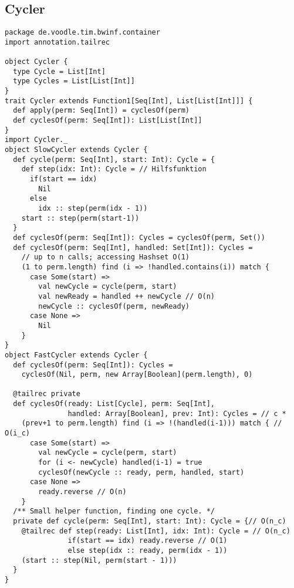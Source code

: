 \subsection{Cycler}
\lstset{basicstyle=\ttfamily\small}
\begin{lstlisting}
package de.voodle.tim.bwinf.container
import annotation.tailrec

object Cycler {
  type Cycle = List[Int]
  type Cycles = List[List[Int]]
}
trait Cycler extends Function1[Seq[Int], List[List[Int]]] {
  def apply(perm: Seq[Int]) = cyclesOf(perm)
  def cyclesOf(perm: Seq[Int]): List[List[Int]]
}
import Cycler._
object SlowCycler extends Cycler {
  def cycle(perm: Seq[Int], start: Int): Cycle = {
    def step(idx: Int): Cycle = // Hilfsfunktion
      if(start == idx)
        Nil
      else
        idx :: step(perm(idx - 1))
    start :: step(perm(start-1))
  }
  def cyclesOf(perm: Seq[Int]): Cycles = cyclesOf(perm, Set())
  def cyclesOf(perm: Seq[Int], handled: Set[Int]): Cycles =
    // up to n calls; accessing Hashset O(1)
    (1 to perm.length) find (i => !handled.contains(i)) match {
      case Some(start) =>
        val newCycle = cycle(perm, start)
        val newReady = handled ++ newCycle // O(n)
        newCycle :: cyclesOf(perm, newReady)
      case None =>
        Nil
    }
}
object FastCycler extends Cycler {
  def cyclesOf(perm: Seq[Int]): Cycles =
    cyclesOf(Nil, perm, new Array[Boolean](perm.length), 0)

  @tailrec private
  def cyclesOf(ready: List[Cycle], perm: Seq[Int],
               handled: Array[Boolean], prev: Int): Cycles = // c *
    (prev+1 to perm.length) find (i => !(handled(i-1))) match { // O(i_c)
      case Some(start) =>
        val newCycle = cycle(perm, start)
        for (i <- newCycle) handled(i-1) = true
        cyclesOf(newCycle :: ready, perm, handled, start)
      case None =>
        ready.reverse // O(n)
    }
  /** Small helper function, finding one cycle. */
  private def cycle(perm: Seq[Int], start: Int): Cycle = {// O(n_c)
    @tailrec def step(ready: List[Int], idx: Int): Cycle = // O(n_c)
               if(start == idx) ready.reverse // O(1)
               else step(idx :: ready, perm(idx - 1))
    (start :: step(Nil, perm(start - 1)))
  }
}
\end{lstlisting}
\clearpage
